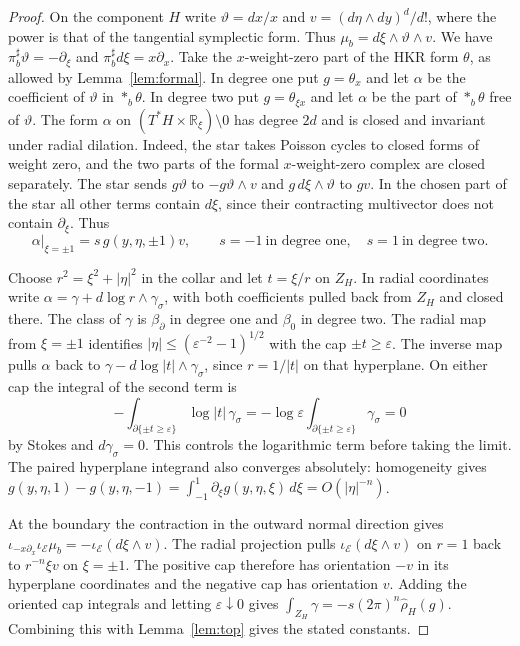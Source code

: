 \documentclass[11pt,oneside,reqno]{article}
\theoremstyle{plain}
\theoremstyle{definition}
\theoremstyle{remark}
\begin{document}
\begin{proof}
On the component \(H\) write \(\vartheta=dx/x\) and
\(v=(d\eta\wedge dy)^d/d!\), where the power is that of the tangential
symplectic form. Thus \(\mu_b=d\xi\wedge\vartheta\wedge v\).
We have \(\pi_b^\sharp\vartheta=-\partial_\xi\) and
\(\pi_b^\sharp d\xi=x\partial_x\). Take the \(x\)-weight-zero
part of the HKR form \(\theta\), as allowed by Lemma~\ref{lem:formal}.
In degree one put \(g=\theta_x\) and let \(\alpha\) be the
coefficient of \(\vartheta\) in \(*_b\theta\). In degree two put
\(g=\theta_{\xi x}\) and let \(\alpha\) be the part of \(*_b\theta\)
free of \(\vartheta\). The form \(\alpha\) on
\((T^*H\times\mathbb R_\xi)\setminus0\) has degree \(2d\) and is
closed and invariant under radial dilation. Indeed, the star takes
Poisson cycles to closed forms of weight zero, and the two parts
of the formal \(x\)-weight-zero complex are closed separately.
The star sends \(g\vartheta\) to \(-g\vartheta\wedge v\) and
\(g\,d\xi\wedge\vartheta\) to \(gv\). In the chosen part of the
star all other terms contain \(d\xi\), since their contracting
multivector does not contain \(\partial_\xi\). Thus
\[
 \alpha|_{\xi=\pm1}=s\,g(y,\eta,\pm1)v,\qquad
 s=-1\ \text{in degree one},\quad s=1\ \text{in degree two}.
\]

Choose \(r^2=\xi^2+|\eta|^2\) in the collar and let \(t=\xi/r\)
on \(Z_H\). In radial coordinates write
\(\alpha=\gamma+d\log r\wedge\gamma_\sigma\), with both coefficients
pulled back from \(Z_H\) and closed there. The class of \(\gamma\)
is \(\beta_\partial\) in degree one and \(\beta_0\) in degree two.
The radial map from \(\xi=\pm1\) identifies
\(|\eta|\leq(\varepsilon^{-2}-1)^{1/2}\) with the cap
\(\pm t\geq\varepsilon\). The inverse map pulls \(\alpha\) back to
\(\gamma-d\log|t|\wedge\gamma_\sigma\), since \(r=1/|t|\) on
that hyperplane. On either cap the integral of the second term is
\[
 -\int_{\partial\{\pm t\geq\varepsilon\}}
            \log|t|\,\gamma_\sigma
 =-\log\varepsilon\int_{\partial\{\pm t\geq\varepsilon\}}
             \gamma_\sigma=0
\]
by Stokes and \(d\gamma_\sigma=0\). This controls the logarithmic
term before taking the limit. The paired hyperplane integrand also
converges absolutely: homogeneity gives
\(g(y,\eta,1)-g(y,\eta,-1)=\int_{-1}^1\partial_\xi
g(y,\eta,\xi)\,d\xi=O(|\eta|^{-n})\).

At the boundary the contraction in the outward normal direction gives
\(\iota_{-x\partial_x}\iota_{\mathcal E}\mu_b
=-\iota_{\mathcal E}(d\xi\wedge v)\).
The radial projection pulls \(\iota_{\mathcal E}(d\xi\wedge v)\)
on \(r=1\) back to \(r^{-n}\xi v\) on \(\xi=\pm1\). The
positive cap therefore has orientation \(-v\) in its hyperplane
coordinates and the negative cap has orientation \(v\). Adding the
oriented cap integrals and letting \(\varepsilon\downarrow0\) gives
\(\int_{Z_H}\gamma=-s(2\pi)^n\hat\rho_H(g)\).
Combining this with Lemma~\ref{lem:top} gives the stated constants.
\end{proof}
\end{document}

